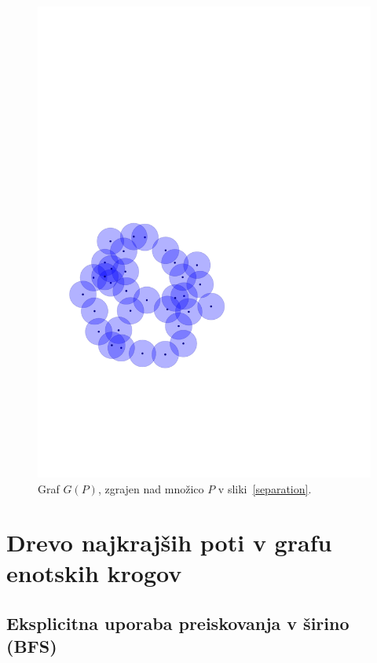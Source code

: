 \documentclass[a4paper, 12pt]{book}
\begin{document}
\begin{figure}[htp]
\centerline{\includegraphics[scale=0.6,page=5]{pics/unitdisks.pdf}}
\caption{Graf $G(P)$, zgrajen nad množico $P$ v sliki~\ref{separation}.}
\label{gdisks}
\end{figure}

\section{Drevo najkrajših poti v grafu enotskih krogov}
\subsection{Eksplicitna uporaba preiskovanja v širino (BFS)}
\label{bfs-theory}
\end{document}
